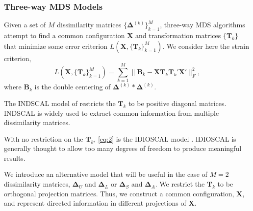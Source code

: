 \documentclass[professionalfonts,hyperref={pdfpagelabels=false,colorlinks=true,linkcolor=cyan}]{beamer}
\begin{document}
\begin{frame}
  \frametitle{Three-way MDS Models}
  Given a set of $M$ dissimilarity matrices
  $\{\bm{\Delta}^{(k)}\}_{k=1}^{M}$, three-way MDS algorithms attempt
  to find a common configuration $\mathbf{X}$ and transformation
  matrices $\{\mathbf{T}_k\}$ that minimize some error criterion 
  $L(\mathbf{X},
  \{\mathbf{T}_k\}_{k=1}^{M})$. We consider here the strain criterion, 
  \begin{equation}
    \label{eq:2}
    L(\mathbf{X}, \{\mathbf{T}_k\}_{k=1}^{M}) = \sum_{k = 1}^{M}\| \mathbf{B}_k -
    \mathbf{X}\mathbf{T}_k \mathbf{T}_k' \mathbf{X}' \|_F^2, 
  \end{equation}
  where $\mathbf{B}_k$ is the double centering of $\bm{\Delta}^{(k)}
  \ast \bm{\Delta}^{(k)}$.
\end{frame}
\begin{frame}
  The INDSCAL model of \cite{carroll70:_analy_n_eckar_young}
  restricts the $\mathbf{T}_k$ to be positive diagonal
  matrices. INDSCAL is widely used to extract common information from
  multiple dissimilarity matrices.
  
  \vskip10pt With no restriction on the $\mathbf{T}_k$, \eqref{eq:2}
  is the IDIOSCAL model \cite{carroll74:_contem}. IDIOSCAL is
  generally thought to allow too many degrees of freedom to produce
  meaningful results. 
  
  \vskip10pt We introduce an alternative model that will be useful in
  the case of $M = 2$ dissimilarity matrices, $\bm{\Delta}_{U}$ and
  $\bm{\Delta}_{L}$ or $\bm{\Delta}_{S}$ and $\bm{\Delta}_{A}$. We
  restrict the $\mathbf{T}_k$ to be orthogonal projection
  matrices. Thus, we construct a common configuration, $\mathbf{X}$,
  and represent directed information in different projections of
  $\mathbf{X}$.
\end{frame}
\end{document}
